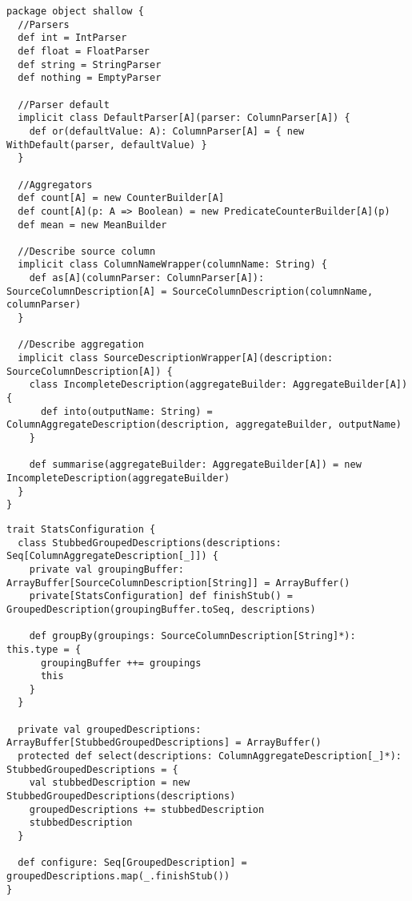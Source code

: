\begin{lstlisting}[caption=shallow package object, label=code:shallow,float,floatplacement=H]
package object shallow {
  //Parsers
  def int = IntParser
  def float = FloatParser
  def string = StringParser
  def nothing = EmptyParser

  //Parser default
  implicit class DefaultParser[A](parser: ColumnParser[A]) {
    def or(defaultValue: A): ColumnParser[A] = { new WithDefault(parser, defaultValue) }
  }

  //Aggregators
  def count[A] = new CounterBuilder[A]
  def count[A](p: A => Boolean) = new PredicateCounterBuilder[A](p)
  def mean = new MeanBuilder

  //Describe source column
  implicit class ColumnNameWrapper(columnName: String) {
    def as[A](columnParser: ColumnParser[A]): SourceColumnDescription[A] = SourceColumnDescription(columnName, columnParser)
  }

  //Describe aggregation
  implicit class SourceDescriptionWrapper[A](description: SourceColumnDescription[A]) {
    class IncompleteDescription(aggregateBuilder: AggregateBuilder[A]) {
      def into(outputName: String) = ColumnAggregateDescription(description, aggregateBuilder, outputName)
    }

    def summarise(aggregateBuilder: AggregateBuilder[A]) = new IncompleteDescription(aggregateBuilder)
  }
}
\end{lstlisting}

\begin{lstlisting}[caption=StatsConfiguration, label=code:config,float,floatplacement=H]
trait StatsConfiguration {
  class StubbedGroupedDescriptions(descriptions: Seq[ColumnAggregateDescription[_]]) {
    private val groupingBuffer: ArrayBuffer[SourceColumnDescription[String]] = ArrayBuffer()
    private[StatsConfiguration] def finishStub() = GroupedDescription(groupingBuffer.toSeq, descriptions)

    def groupBy(groupings: SourceColumnDescription[String]*): this.type = {
      groupingBuffer ++= groupings
      this
    }
  }

  private val groupedDescriptions: ArrayBuffer[StubbedGroupedDescriptions] = ArrayBuffer()
  protected def select(descriptions: ColumnAggregateDescription[_]*): StubbedGroupedDescriptions = {
    val stubbedDescription = new StubbedGroupedDescriptions(descriptions)
    groupedDescriptions += stubbedDescription
    stubbedDescription
  }

  def configure: Seq[GroupedDescription] = groupedDescriptions.map(_.finishStub())
}
\end{lstlisting}

